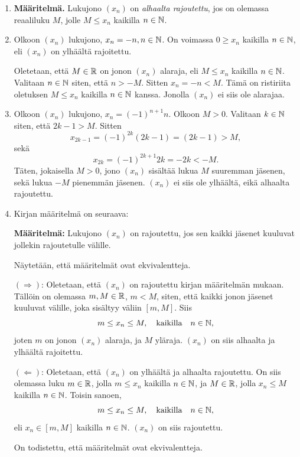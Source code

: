 \documentclass[12pt,a4paper]{article}
\begin{document}
\begin{solution}
\leavevmode\par
\begin{enumerate}[label=\alph*), nosep]
\item \textbf{Määritelmä.} Lukujono \((x_n)\) on \emph{alhaalta rajoutettu},
  jos on olemassa reaaliluku \(M\), jolle \(M \leq x_n\) kaikilla \(n \in \mathbb{N}\).
\item Olkoon \((x_n)\) lukujono, \(x_n = -n, n \in \mathbb{N}\). On voimassa
  \(0 \geq x_n\) kaikilla \(n \in \mathbb{N}\), eli \((x_n)\) on ylhäältä
  rajoitettu.

  Oletetaan, että \(M \in \mathbb{R}\) on jonon \((x_n)\) alaraja, eli
  \(M \leq x_n\) kaikilla \(n \in \mathbb{N}\).
  Valitaan \(n \in \mathbb{N}\) siten, että \(n > -M\). Sitten
  \(x_n = -n < M\). Tämä on ristiriita oletuksen
  \(M \leq x_n\) kaikilla \(n \in \mathbb{N}\) kanssa. Jonolla \((x_n)\) ei
  siis ole alarajaa.
\item Olkoon \((x_n)\) lukujono, \(x_n = (-1)^{n + 1}n\). Olkoon \(M > 0\).
  Valitaan \(k \in \mathbb{N}\) siten, että \(2k - 1 > M\). Sitten
  \[
    x_{2k - 1} = (-1)^{2k} (2k - 1) = (2k - 1) > M,
  \]
  sekä
  \[
    x_{2k} = (-1)^{2k + 1} 2k = -2k < -M.
  \]
  Täten, jokaisella \(M > 0\), jono \((x_n)\) sisältää lukua \(M\) suuremman
  jäsenen, sekä lukua \(-M\) pienemmän jäsenen. \((x_n)\) ei siis ole
  ylhäältä, eikä alhaalta rajoutettu.
\item Kirjan määritelmä on seuraava:

  \textbf{Määritelmä:} Lukujono \((x_n)\) on rajoutettu, jos sen kaikki jäsenet
  kuuluvat jollekin rajoutetulle välille.

  Näytetään, että määritelmät ovat ekvivalentteja.

  \((\Rightarrow)\): Oletetaan, että \((x_n)\) on rajoutettu kirjan määritelmän
  mukaan. Tällöin on olemassa \(m, M \in \mathbb{R}\), \(m < M\), siten, että
  kaikki jonon jäsenet kuuluvat välille, joka sisältyy väliin \([m, M]\).
  Siis
  \[
    m \leq x_n \leq M, \quad \text{kaikilla} \quad n \in \mathbb{N},
  \]
  joten \(m\) on jonon \((x_n)\) alaraja, ja \(M\) yläraja. \((x_n)\) on siis
  alhaalta ja ylhäältä rajoitettu.

  \((\Leftarrow)\): Oletetaan, että \((x_n)\) on ylhäältä ja alhaalta
  rajoutettu. On siis olemassa luku \(m \in \mathbb{R}\), jolla \(m \leq x_n\) kaikilla
  \(n \in \mathbb{N}\), ja \(M \in \mathbb{R}\), jolla \(x_n \leq M\) kaikilla \(n \in \mathbb{N}\).
  Toisin sanoen,
  \[
    m \leq x_n \leq M, \quad \text{kaikilla} \quad n \in \mathbb{N},
  \]
  eli \(x_n \in [m, M]\) kaikilla \(n \in \mathbb{N}\). \((x_n)\) on siis rajoutettu.

  On todistettu, että määritelmät ovat ekvivalentteja.
\end{enumerate}
\end{solution}
\end{document}
